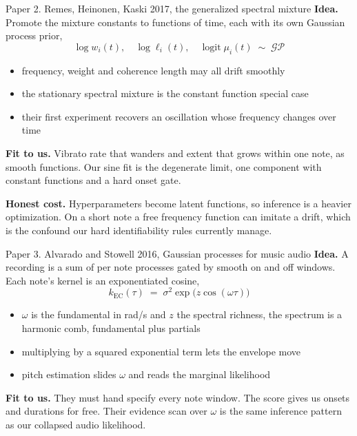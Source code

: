 \documentclass[aspectratio=169,11pt]{beamer}
\begin{document}
\begin{frame}{Paper 2. Remes, Heinonen, Kaski 2017, the generalized spectral mixture}
  \textbf{Idea.} Promote the mixture constants to functions of time,
  each with its own Gaussian process prior,
  \[
    \log w_i(t), \quad \log \ell_i(t), \quad \operatorname{logit} \mu_i(t)
    \;\sim\; \mathcal{GP}
  \]
  \begin{itemize}
    \item frequency, weight and coherence length may all drift smoothly
    \item the stationary spectral mixture is the constant function
          special case
    \item their first experiment recovers an oscillation whose frequency
          changes over time
  \end{itemize}
  \vspace{1mm}
  \textbf{Fit to us.} Vibrato rate that wanders and extent that grows
  within one note, as smooth functions. Our sine fit is the degenerate
  limit, one component with constant functions and a hard onset gate.
  \vspace{1mm}

  \textbf{Honest cost.} Hyperparameters become latent functions, so
  inference is a heavier optimization. On a short note a free frequency
  function can imitate a drift, which is the confound our hard
  identifiability rules currently manage.
\end{frame}

\begin{frame}{Paper 3. Alvarado and Stowell 2016, Gaussian processes for music audio}
  \textbf{Idea.} A recording is a sum of per note processes gated by
  smooth on and off windows. Each note's kernel is an exponentiated
  cosine,
  \[
    k_{\mathrm{EC}}(\tau) \;=\; \sigma^2 \exp\!\bigl(z \cos(\omega \tau)\bigr)
  \]
  \begin{itemize}
    \item $\omega$ is the fundamental in rad/s and $z$ the spectral
          richness, the spectrum is a harmonic comb, fundamental plus
          partials
    \item multiplying by a squared exponential term lets the envelope
          move
    \item pitch estimation slides $\omega$ and reads the marginal
          likelihood
  \end{itemize}
  \vspace{1mm}
  \textbf{Fit to us.} They must hand specify every note window. The
  score gives us onsets and durations for free. Their evidence scan over
  $\omega$ is the same inference pattern as our collapsed audio
  likelihood.
\end{frame}
\end{document}
